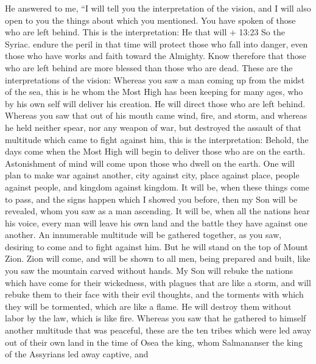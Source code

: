 He answered to me,  ``I will tell you the interpretation of
the vision, and I will also open to you the things about which you
mentioned.  You have spoken of those who are left behind.
This is the interpretation:  He that will + 13:23 So the
Syriac. endure the peril in that time will protect those who fall into
danger, even those who have works and faith toward the Almighty.
 Know therefore that those who are left behind are more
blessed than those who are dead.  These are the
interpretations of the vision: Whereas you saw a man coming up from the
midst of the sea,  this is he whom the Most High has been
keeping for many ages, who by his own self will deliver his creation. He
will direct those who are left behind.  Whereas you saw
that out of his mouth came wind, fire, and storm,  and
whereas he held neither spear, nor any weapon of war, but destroyed the
assault of that multitude which came to fight against him, this is the
interpretation:  Behold, the days come when the Most High
will begin to deliver those who are on the earth. 
Astonishment of mind will come upon those who dwell on the earth.
 One will plan to make war against another, city against
city, place against place, people against people, and kingdom against
kingdom.  It will be, when these things come to pass, and
the signs happen which I showed you before, then my Son will be
revealed, whom you saw as a man ascending.  It will be,
when all the nations hear his voice, every man will leave his own land
and the battle they have against one another.  An
innumerable multitude will be gathered together, as you saw, desiring to
come and to fight against him.  But he will stand on the
top of Mount Zion.  Zion will come, and will be shown to
all men, being prepared and built, like you saw the mountain carved
without hands.  My Son will rebuke the nations which have
come for their wickedness, with plagues that are like a storm,
 and will rebuke them to their face with their evil
thoughts, and the torments with which they will be tormented, which are
like a flame. He will destroy them without labor by the law, which is
like fire.  Whereas you saw that he gathered to himself
another multitude that was peaceful,  these are the ten
tribes which were led away out of their own land in the time of Osea the
king, whom Salmananser the king of the Assyrians led away captive, and
